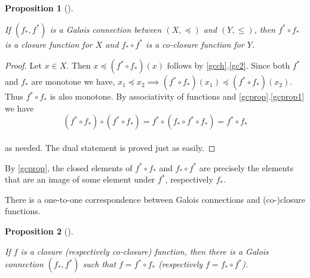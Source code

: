 \documentclass[
  twoside,
  12pt,
  letterpaper,
  fleqn]{article}
\theoremstyle{definition}
\theoremstyle{definition}
\theoremstyle{plain}
\newtheorem{proposition}{Proposition}[section]
\theoremstyle{remark}
\begin{document}
\begin{proposition}[]\protect\hypertarget{prp-galois-connection-closure-function}{}\label{prp-galois-connection-closure-function}

If \((f_*, f^*)\) is a Galois connection between \((X,\preceq)\) and
\((Y,\leqslant)\), then \(f^*\circ f_*\) is a closure function for \(X\)
and \(f_*\circ f^*\) is a co-closure function for \(Y\).

\end{proposition}

\begin{proof}

Let \(x\in X\). Then \(x\preceq (f^*\circ f_*)(x)\) follows by
\eqref{gcch}.\eqref{gc2}. Since both \(f^*\) and \(f_*\) are monotone we
have,
\(x_1\preceq x_2 \implies (f^*\circ f_*)(x_1)\preceq (f^*\circ f_*)(x_2)\).
Thus \(f^*\circ f_*\) is also monotone. By associativity of functions
and \eqref{gcprop}.\eqref{gcprop1} we have \[
(f^*\circ f_*)\circ (f^*\circ f_*)=f^*\circ (f_*\circ f^*\circ f_*)=f^*\circ f_*
\]\\
as needed. The dual statement is proved just as easily.

\end{proof}

By \eqref{gcprop}, the closed elements of \(f^*\circ f_*\) and
\(f_*\circ f^*\) are precisely the elements that are an image of some
element under \(f^*\), respectively \(f_*\).

There is a one-to-one correspondence between Galois connections and
(co-)closure functions.

\begin{proposition}[]\protect\hypertarget{prp-closure-galois-connection}{}\label{prp-closure-galois-connection}

If \(f\) is a closure (respectively co-closure) function, then there is
a Galois connection \((f_*,f^*)\) such that \(f=f^*\circ f_*\)
(respectively \(f=f_*\circ f^*\)).

\end{proposition}
\end{document}
